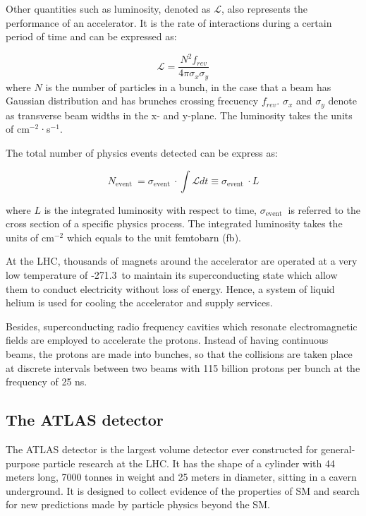 \documentclass[UTF8,12pt]{ctexart}
\numberwithin{equation}{section}
\begin{document}
Other quantities such as luminosity, denoted as $\mathcal{L}$, also represents the performance of an accelerator. It is the rate of interactions during a certain period of time and can be expressed as:

\begin{equation}
\mathcal{L}=\frac{N^2 f_{r e v}}{4 \pi \sigma_x \sigma_y} 
\end{equation}
where $N$ is the number of particles in a bunch, in the case that a beam has Gaussian distribution and has brunches crossing frecuency $f_{rev}$. $\sigma_x$ and $\sigma_y$ denote as transverse beam widths in the x- and y-plane. The luminosity takes the units of cm$^{-2}$·s$^{-1}$.

The total number of physics events detected can be express as:

\begin{equation}
N_{\text {event }}=\sigma_{\text {event }} \cdot \int \mathcal{L} d t \equiv \sigma_{\text {event }} \cdot L
\end{equation}

where $L$ is the integrated luminosity with respect to time, $\sigma_{\text {event }}$ is referred to the cross section of a specific physics process. The integrated luminosity takes the units of cm$^{-2}$ which equals to the unit femtobarn (fb).

 At the LHC, thousands of magnets around the accelerator are operated at a very low temperature of ‑271.3\textcelsius \ to maintain its superconducting state which allow them to conduct electricity without loss of energy. Hence, a system of liquid helium is used for cooling the accelerator and supply services.

Besides, superconducting radio frequency cavities which resonate electromagnetic fields are employed to accelerate the protons. Instead of having continuous beams, the protons are made into bunches, so that the collisions are taken place at discrete intervals between two beams with 115 billion protons per bunch at the frequency of 25 ns.


\subsection{The ATLAS detector}
\label{sec:3.2}

The ATLAS detector is the largest volume detector ever constructed for general-purpose particle research at the LHC. It has the shape of a cylinder with 44 meters long, 7000 tonnes in weight and 25 meters in diameter, sitting in a cavern underground. It is designed to collect evidence of the properties of SM and search for new predictions made by particle physics beyond the SM.
\end{document}
